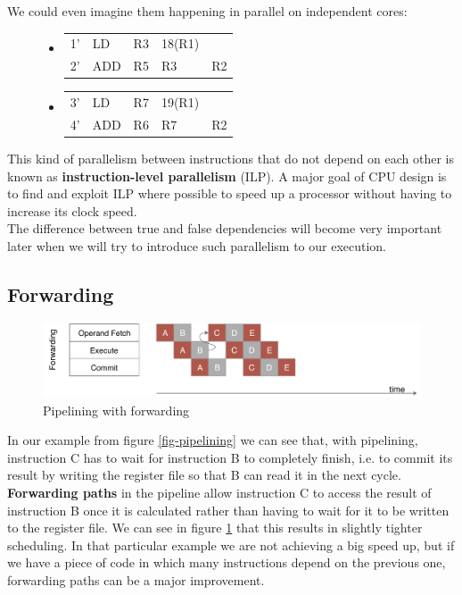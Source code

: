 \documentclass[12pt,a4paper]{article} %
\newenvironment {assembly}{\begingroup \ttfamily \color{Gray} \begin{itemize} \item[]}{\end{itemize}\endgroup}
\begin{document}
We could even imagine them happening in parallel on independent cores:
\begin{figure}[H]
	\centering
	\begin{minipage}{.5\textwidth}
		\begin{assembly}
			\begin{tabularx} {\textwidth} {n o a a X}
				1' & LD  & R3 & 18(R1)	& \\
				2' & ADD & R5 & R3		& R2\\
			\end{tabularx}
		\end{assembly}
	\end{minipage}%
	\vline
	\begin{minipage}{.5\textwidth}
		\begin{assembly}
			\begin{tabularx} {\textwidth} {n o a a X}
				3' & LD  & R7 & 19(R1)	& \\
				4' & ADD & R6 & R7		& R2\\
			\end{tabularx}
		\end{assembly}
	\end{minipage}%
\end{figure}%
This kind of parallelism between instructions that do not depend on each other is known as \textbf{instruction-level parallelism} (ILP). A major goal of CPU design is to find and exploit ILP where possible to speed up a processor without having to increase its clock speed.\\
The difference between true and false dependencies will become very important later when we will try to introduce such parallelism to our execution.

\subsection{Forwarding}
\begin{figure}[H]
	\centering
	\includegraphics[width=\textwidth]{Source/SchedulingSchemes/Forwarding.pdf}
	\caption{Pipelining with forwarding} 
	\label{fig-forwarding}
\end{figure}
In our example from figure \ref{fig-pipelining} we can see that, with pipelining, instruction C has to wait for instruction B to completely finish, i.e. to commit its result by writing the register file so that B can read it in the next cycle. \\
\textbf{Forwarding paths} in the pipeline allow instruction C to access the result of instruction B once it is calculated rather than having to wait for it to be written to the register file. We can see in figure \ref{fig-forwarding} that this results in slightly tighter scheduling. In that particular example we are not achieving a big speed up, but if we have a piece of code in which many instructions depend on the previous one, forwarding paths can be a major improvement.
\end{document}
